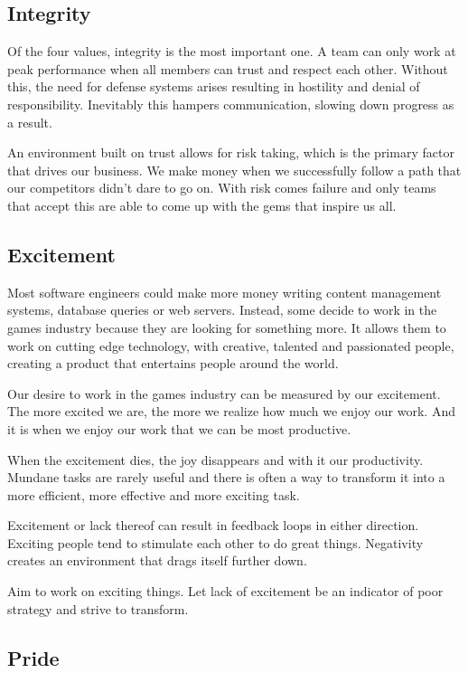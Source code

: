 \documentclass[twocolumn]{paper}
\begin{document}
\subsection{Integrity}

Of the four values, integrity is the most important one. A team can
only work at peak performance when all members can trust and respect
each other. Without this, the need for defense systems arises
resulting in hostility and denial of responsibility. Inevitably this
hampers communication, slowing down progress as a result.

An environment built on trust allows for risk taking, which is the
primary factor that drives our business. We make money when we
successfully follow a path that our competitors didn't dare to go
on. With risk comes failure and only teams that accept this are able
to come up with the gems that inspire us all.

\subsection{Excitement}

Most software engineers could make more money writing content
management systems, database queries or web servers. Instead, some
decide to work in the games industry because they are looking for
something more. It allows them to work on cutting edge technology,
with creative, talented and passionated people, creating a product
that entertains people around the world.

Our desire to work in the games industry can be measured by our
excitement. The more excited we are, the more we realize how much we
enjoy our work. And it is when we enjoy our work that we can be most
productive.

When the excitement dies, the joy disappears and with it our
productivity. Mundane tasks are rarely useful and there is often a
way to transform it into a more efficient, more effective and more
exciting task.

Excitement or lack thereof can result in feedback loops in either
direction. Exciting people tend to stimulate each other to do great
things. Negativity creates an environment that drags itself further
down.

Aim to work on exciting things. Let lack of excitement be an
indicator of poor strategy and strive to transform.

\subsection{Pride}
\end{document}
